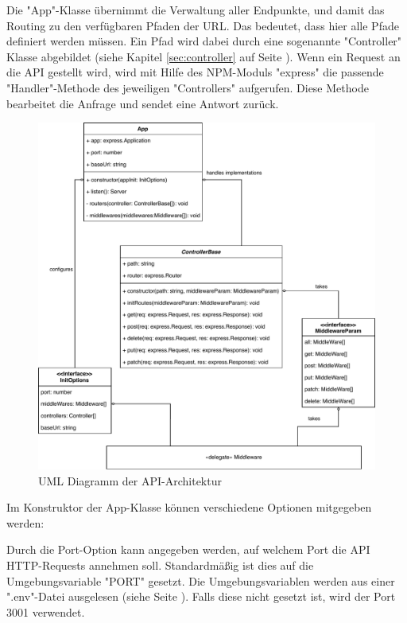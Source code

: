 \label{sec:app}

Die "App"-Klasse übernimmt die Verwaltung aller Endpunkte, und damit das Routing zu den verfügbaren Pfaden der URL.
Das bedeutet, dass hier alle Pfade definiert werden müssen. 
Ein Pfad wird dabei durch eine sogenannte "Controller" Klasse abgebildet (siehe Kapitel \ref{sec:controller} auf Seite \pageref{sec:controller}). 
Wenn ein Request an die API gestellt wird, wird mit Hilfe des NPM-Moduls "express" die passende "Handler"-Methode des jeweiligen "Controllers" aufgerufen. 
Diese Methode bearbeitet die Anfrage und sendet eine Antwort zurück.

\begin{figure}[H]
    \centering
    \includegraphics[width=\textwidth]{media/APITemplate/apiArchitecture.svg.pdf}
    \caption{UML Diagramm der API-Architektur}
    \label{fig:apiUML}
\end{figure}

\pagebreak

\label{sec:appConstructor}

Im Konstruktor der App-Klasse können verschiedene Optionen mitgegeben werden:


Durch die Port-Option kann angegeben werden, auf welchem Port die API HTTP-Requests annehmen soll. Standardmäßig ist dies auf die Umgebungsvariable "PORT" gesetzt. Die Umgebungsvariablen werden aus einer ".env"-Datei ausgelesen (siehe Seite \pageref{par:dockerEnvFile}). Falls diese nicht gesetzt ist, wird der Port 3001 verwendet.

